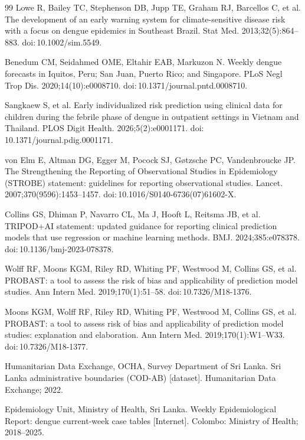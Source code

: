 \documentclass[11pt,a4paper]{article}
\begin{document}
\begin{thebibliography}{99}
 Lowe R, Bailey TC, Stephenson DB, Jupp TE, Graham RJ, Barcellos C, et al. The development of an early warning system for climate-sensitive disease risk with a focus on dengue epidemics in Southeast Brazil. Stat Med. 2013;32(5):864--883. doi:\,10.1002/sim.5549.

 Benedum CM, Seidahmed OME, Eltahir EAB, Markuzon N. Weekly dengue forecasts in Iquitos, Peru; San Juan, Puerto Rico; and Singapore. PLoS Negl Trop Dis. 2020;14(10):e0008710. doi:\,10.1371/journal.pntd.0008710.

 Sangkaew S, et al. Early individualized risk prediction using clinical data for children during the febrile phase of dengue in outpatient settings in Vietnam and Thailand. PLOS Digit Health. 2026;5(2):e0001171. doi:\,10.1371/journal.pdig.0001171.

 von Elm E, Altman DG, Egger M, Pocock SJ, G\o tzsche PC, Vandenbroucke JP. The Strengthening the Reporting of Observational Studies in Epidemiology (STROBE) statement: guidelines for reporting observational studies. Lancet. 2007;370(9596):1453--1457. doi:\,10.1016/S0140-6736(07)61602-X.

 Collins GS, Dhiman P, Navarro CL, Ma J, Hooft L, Reitsma JB, et al. TRIPOD+AI statement: updated guidance for reporting clinical prediction models that use regression or machine learning methods. BMJ. 2024;385:e078378. doi:\,10.1136/bmj-2023-078378.

 Wolff RF, Moons KGM, Riley RD, Whiting PF, Westwood M, Collins GS, et al. PROBAST: a tool to assess the risk of bias and applicability of prediction model studies. Ann Intern Med. 2019;170(1):51--58. doi:\,10.7326/M18-1376.

 Moons KGM, Wolff RF, Riley RD, Whiting PF, Westwood M, Collins GS, et al. PROBAST: a tool to assess risk of bias and applicability of prediction model studies: explanation and elaboration. Ann Intern Med. 2019;170(1):W1--W33. doi:\,10.7326/M18-1377.

 Humanitarian Data Exchange, OCHA, Survey Department of Sri Lanka. Sri Lanka administrative boundaries (COD-AB) [dataset]. Humanitarian Data Exchange; 2022.

 Epidemiology Unit, Ministry of Health, Sri Lanka. Weekly Epidemiological Report: dengue current-week case tables [Internet]. Colombo: Ministry of Health; 2018--2025.


\end{thebibliography}
\end{document}
